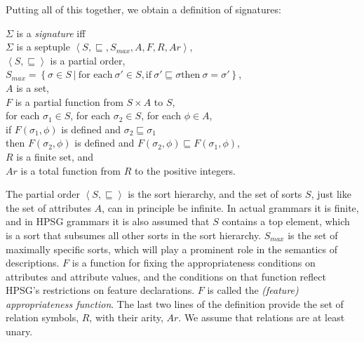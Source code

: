 \documentclass[output=paper
                ,modfonts
                ,nonflat
	        ,collection
	        ,collectionchapter
	        ,collectiontoclongg
 	        ,biblatex
                ,babelshorthands
                ,newtxmath
                ,draftmode
                ,colorlinks, citecolor=brown
]{./langsci/langscibook}
\begin{document}
{{Putting all of this together, we obtain a definition of signatures:

\begin{mydef}\label{def-signature}
  $\Sigma$ is a \emph{signature} iff\\
  $\Sigma$ is a septuple $\left<S,\sqsubseteq,S_{max},A,F,R,Ar\right>$,\\
  $\left<S,\sqsubseteq\right>$ is a partial order,\\
  $S_{max} = \left\{\sigma\in S\ |\ \mbox{for each}\ \sigma' \in S, \mbox{if}\ \sigma'\sqsubseteq\sigma \mbox{then}\ \sigma=\sigma'\right\}$,\\
  $A$ is a set,\\
  $F$ is a partial function from $S\times A$ to $S$,\\
  for each $\sigma_1\in S$, for each $\sigma_2\in S$, for each $\phi\in A$,\\
  \hspace*{.5cm} if $F(\sigma_1,\phi)$ is defined and $\sigma_2\sqsubseteq\sigma_1$\\
  \hspace*{.5cm} then $F(\sigma_2,\phi)$ is defined and
             $F(\sigma_2,\phi)\sqsubseteq F(\sigma_1,\phi)$,\\
  $R$ is a finite set, and\\
  $Ar$ is a total function from $R$ to the positive integers.
\end{mydef}

The partial order $\left<S,\sqsubseteq\right>$ is the sort hierarchy,
and the set of sorts $S$, just like the set of attributes $A$, can in principle
be infinite. In actual grammars it is finite, and in HPSG grammars it is
also assumed that $S$ contains a top element, which is a sort that subsumes
all other sorts in the sort hierarchy. $S_{max}$ is the set of maximally
specific sorts, which will play a prominent role in the semantics of
descriptions. $F$ is a function for fixing the appropriateness conditions
on attributes and attribute values, and the conditions on that function
reflect HPSG's restrictions on feature declarations. $F$ is called the
\emph{(feature) appropriateness function}. The last two lines of
the definition provide the set of relation symbols, $R$, with their arity, $Ar$.
We assume that relations are at least unary.

}}
\end{document}
